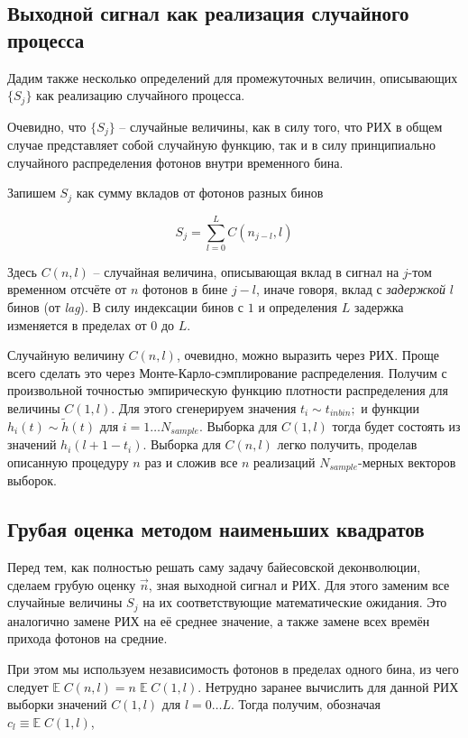 \documentclass[12pt]{article}
\begin{document}
	\subsection{Выходной сигнал как реализация случайного процесса}

	Дадим также несколько определений для промежуточных величин, описывающих $\{ S_j \}$ как реализацию случайного процесса.

	Очевидно, что $\{ S_j \}$ -- случайные величины, как в силу того, что РИХ в общем случае представляет собой случайную функцию, так и в силу принципиально случайного распределения фотонов внутри временного бина.
	
	Запишем $S_j$ как сумму вкладов от фотонов разных бинов
	
	\begin{equation}
		S_j = \sum_{l=0}^{L} C(n_{j-l}, l)
		\label{eq:sum_breakdown}
	\end{equation}

	Здесь $C(n, l)$ -- случайная величина, описывающая вклад в сигнал на $j$-том временном отсчёте от $n$ фотонов в бине $j - l$, иначе говоря, вклад с \textit{задержкой} $l$ бинов (от \textit{lag}). В силу индексации бинов с $1$ и определения $L$ задержка изменяется в пределах от $0$ до $L$.
	
	Случайную величину $C(n, l)$, очевидно, можно выразить через РИХ. Проще всего сделать это через Монте-Карло-сэмплирование распределения. Получим с произвольной точностью эмпирическую функцию плотности распределения для величины $C(1, l)$. Для этого сгенерируем значения $t_i \sim t_{inbin};$ и функции $h_i(t) \sim \tilde{h}(t)$ для $i = 1 \ldots N_{sample}$. Выборка для $C(1, l)$ тогда будет состоять из значений $h_i(l + 1 - t_i)$. Выборка для $C(n, l)$ легко получить, проделав описанную процедуру $n$ раз и сложив все $n$ реализаций $N_{sample}$-мерных векторов выборок.

	\subsection{Грубая оценка методом наименьших квадратов}
	
	Перед тем, как полностью решать саму задачу байесовской деконволюции, сделаем грубую оценку $\vec{n}$, зная выходной сигнал и РИХ. Для этого заменим все случайные величины $S_j$ на их соответствующие математические ожидания. Это аналогично замене РИХ на её среднее значение, а также замене всех времён прихода фотонов на средние.
	
	При этом мы используем независимость фотонов в пределах одного бина, из чего следует $ \mathbb{E} \; C(n, l) = n \; \mathbb{E} \; C(1, l)$. Нетрудно заранее вычислить для данной РИХ выборки значений $C(1, l)$ для $l = 0 \ldots L$. Тогда получим, обозначая $c_l \equiv \mathbb{E} \; C(1, l)$,
	
\end{document}
